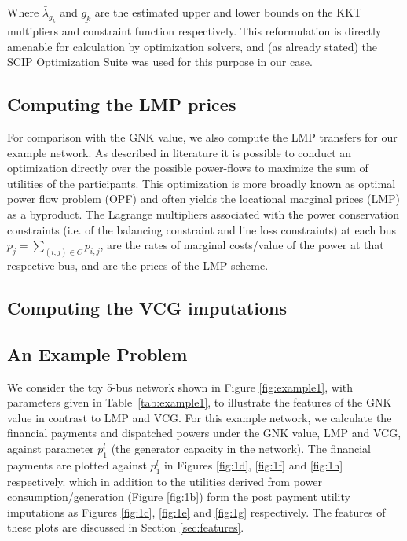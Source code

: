 Where $\bar{\lambda}_{g_k}$ and $\underline{g_k}$ are the estimated upper and lower bounds on the KKT multipliers and constraint function respectively.
This reformulation is directly amenable for calculation by optimization solvers, and (as already stated) the SCIP Optimization Suite \cite{MaherFischerGallyetal.2017} 
was used for this purpose in our case.


\subsection{Computing the LMP prices}

For comparison with the GNK value, we also compute the LMP transfers for our example network.
As described in literature \cite{lmp1,lmp2} it is possible to conduct an optimization directly over the possible power-flows to maximize the sum of utilities of the participants.
This optimization is more broadly known as optimal power flow problem (OPF) and often yields the locational marginal prices (LMP) as a byproduct.
The Lagrange multipliers associated with the power conservation constraints (i.e. of the balancing constraint and line loss constraints) at each bus $p_j = \sum_{(i,j)\in C}p_{i,j}$, are the rates of marginal costs/value of the power at that respective bus, and are the prices of the LMP scheme.



\subsection{Computing the VCG imputations}



\subsection{An Example Problem}\label{sec:example_network}

We consider the toy 5-bus network shown in Figure \ref{fig:example1}, with parameters given in Table~\ref{tab:example1}, to illustrate the features of the GNK value in contrast to LMP and VCG.
For this example network, we calculate the financial payments and dispatched powers under the GNK value, LMP and VCG, against parameter $p_1^l$ (the generator capacity in the network).
The financial payments are plotted against $p_1^l$ in Figures \ref{fig:1d}, \ref{fig:1f} and \ref{fig:1h} respectively. which in addition to the utilities derived from power consumption/generation (Figure \ref{fig:1b}) form the post payment utility imputations as Figures \ref{fig:1c}, \ref{fig:1e} and \ref{fig:1g} respectively. The features of these plots are discussed in Section \ref{sec:features}.


